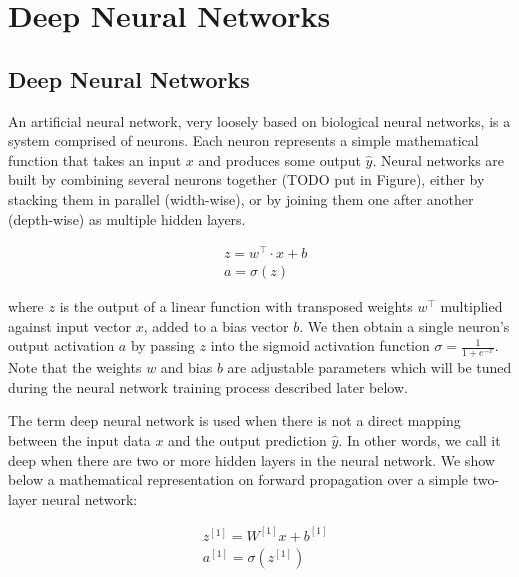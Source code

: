 
\section{Deep Neural Networks}

\subsection{Deep Neural Networks}

An artificial neural network, very loosely based on biological neural networks, is a system comprised of neurons.
Each neuron represents a simple mathematical function that takes an input $x$ and produces some output $\hat{y}$.
Neural networks are built by combining several neurons together (TODO put in Figure), either by stacking them in parallel (width-wise), or by joining them one after another (depth-wise) as multiple hidden layers.

\begin{align}
  & z = w^{\intercal} \cdot x + b \label{eq:2.1}\\
  & a = \sigma(z) \label{eq:2.2}
\end{align}

where $z$ is the output of a linear function with transposed weights $w^\intercal$ multiplied against input vector $x$, added to a bias vector $b$.
We then obtain a single neuron's output activation $a$ by passing $z$ into the sigmoid activation function $\sigma = \frac{1}{1+e^{-x}}$.
Note that the weights $w$ and bias $b$ are adjustable parameters which will be tuned during the neural network training process described later below.

The term deep neural network is used when there is not a direct mapping between the input data $x$ and the output prediction $\hat{y}$.
In other words, we call it deep when there are two or more hidden layers in the neural network.
We show below a mathematical representation on forward propagation over a simple two-layer neural network:

\begin{equation}\label{eq:2.3}
  \begin{aligned}
    & z^{{[1]}} = W^{[1]}x + b^{[1]} \\
    & a^{[1]} = \sigma(z^{[1]})
  \end{aligned}
\end{equation}

